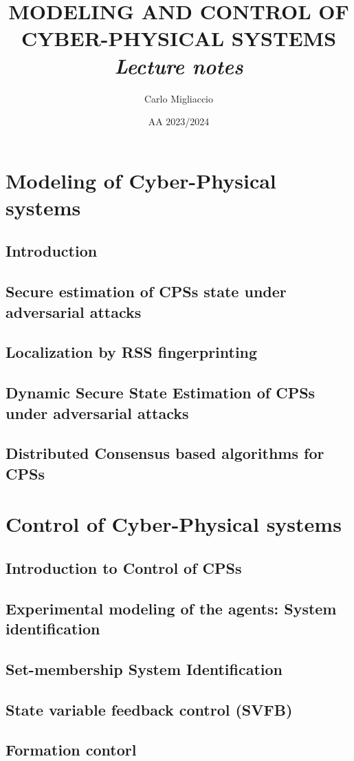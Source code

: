 \documentclass[a4paper, 12pt]{report}
\title{
    \textbf{  \Huge{  MODELING AND  CONTROL OF\\ 
    CYBER-PHYSICAL SYSTEMS } }\\
    \textit{Lecture notes}
}
\author{Carlo Migliaccio}
\date{AA 2023/2024}
\begin{document}
\maketitle
\tableofcontents

\part{Modeling of Cyber-Physical systems}
\chapter{Introduction}


\chapter{Secure estimation of CPSs state under adversarial attacks}


\chapter{Localization by RSS fingerprinting}


\chapter {Dynamic Secure State Estimation of CPSs under adversarial attacks}


\chapter{Distributed Consensus based algorithms for CPSs}



\part{Control of Cyber-Physical systems}
\chapter{Introduction to Control of CPSs}


\chapter{Experimental modeling of the agents: System identification}


\chapter{Set-membership System Identification}

\chapter{State variable feedback control (SVFB)}

\chapter{Formation contorl}
\end{document}
